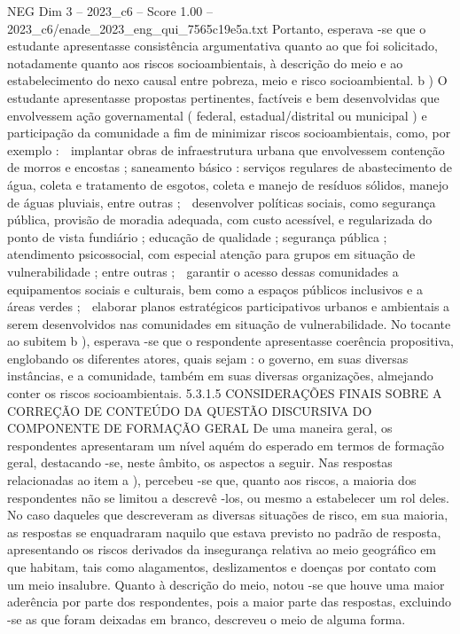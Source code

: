 \begin{textsample}{NEG Dim 3 – 2023\_c6 – Score 1.00 – 2023\_c6/enade\_2023\_eng\_qui\_7565c19e5a.txt}
Portanto, esperava -se que o estudante apresentasse consistência argumentativa quanto ao que foi solicitado, notadamente quanto aos riscos socioambientais, à descrição do meio e ao estabelecimento do nexo causal entre pobreza, meio e risco socioambiental. b ) O estudante apresentasse propostas pertinentes, factíveis e bem desenvolvidas que envolvessem ação governamental ( federal, estadual/distrital ou municipal ) e participação da comunidade a fim de minimizar riscos socioambientais, como, por exemplo :  implantar obras de infraestrutura urbana que envolvessem contenção de morros e encostas ; saneamento básico : serviços regulares de abastecimento de água, coleta e tratamento de esgotos, coleta e manejo de resíduos sólidos, manejo de águas pluviais, entre outras ;  desenvolver políticas sociais, como segurança pública, provisão de moradia adequada, com custo acessível, e regularizada do ponto de vista fundiário ; educação de qualidade ; segurança pública ; atendimento psicossocial, com especial atenção para grupos em situação de vulnerabilidade ; entre outras ;  garantir o acesso dessas comunidades a equipamentos sociais e culturais, bem como a espaços públicos inclusivos e a áreas verdes ;  elaborar planos estratégicos participativos urbanos e ambientais a serem desenvolvidos nas comunidades em situação de vulnerabilidade.
No tocante ao subitem b ), esperava -se que o respondente apresentasse coerência propositiva, englobando os diferentes atores, quais sejam : o governo, em suas diversas instâncias, e a comunidade, também em suas diversas organizações, almejando conter os riscos socioambientais. 5.3.1.5 CONSIDERAÇÕES FINAIS SOBRE A CORREÇÃO DE CONTEÚDO DA QUESTÃO DISCURSIVA DO COMPONENTE DE FORMAÇÃO GERAL De uma maneira geral, os respondentes apresentaram um nível aquém do esperado em termos de formação geral, destacando -se, neste âmbito, os aspectos a seguir.
Nas respostas relacionadas ao item a ), percebeu -se que, quanto aos riscos, a maioria dos respondentes não se limitou a descrevê -los, ou mesmo a estabelecer um rol deles.
No caso daqueles que descreveram as diversas situações de risco, em sua maioria, as respostas se enquadraram naquilo que estava previsto no padrão de resposta, apresentando os riscos derivados da insegurança relativa ao meio geográfico em que habitam, tais como alagamentos, deslizamentos e doenças por contato com um meio insalubre.
Quanto à descrição do meio, notou -se que houve uma maior aderência por parte dos respondentes, pois a maior parte das respostas, excluindo -se as que foram deixadas em branco, descreveu o meio de alguma forma.

\end{textsample}
